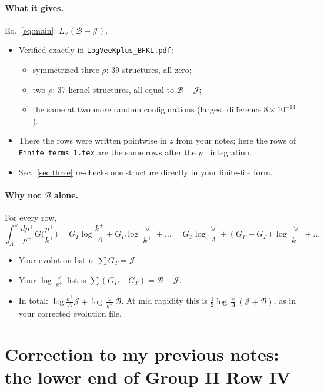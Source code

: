 \documentclass[10pt]{article}
\numberwithin{equation}{section}
\newcommand{\Lv}{L_{\vee}}
\newcommand{\JJ}{\mathcal J}
\newcommand{\BB}{\mathcal B}
\begin{document}
\paragraph{What it gives.} Eq.~\eqref{eq:main}: $\Lv(\BB-\JJ)$.
\begin{itemize}
\item Verified exactly in \texttt{LogVeeKplus\_BFKL.pdf}:
\begin{itemize}
\item symmetrized three-$\rho$: 39 structures, all zero;
\item two-$\rho$: 37 kernel structures, all equal to $\BB-\JJ$;
\item the same at two more random configurations (largest difference $8\times10^{-14}$).
\end{itemize}
\item There the rows were written pointwise in $z$ from your notes; here the rows of \texttt{Finite\_terms\_1.tex} are the same rows after the $p^+$ integration.
\item Sec.~\ref{sec:three} re-checks one structure directly in your finite-file form.
\end{itemize}

\paragraph{Why not $\BB$ alone.} For every row,
\begin{equation}
\int_\Lambda^\vee\frac{dp^+}{p^+}G\Big(\frac{p^+}{k^+}\Big)=G_T\log\frac{k^+}{\Lambda}+G_P\log\frac{\vee}{k^+}+\dots=G_T\log\frac{\vee}{\Lambda}+(G_P-G_T)\log\frac{\vee}{k^+}+\dots
\end{equation}
\begin{itemize}
\item Your evolution list is $\sum G_T=\JJ$.
\item Your $\log\frac{\vee}{k^+}$ list is $\sum(G_P-G_T)=\BB-\JJ$.
\item In total: $\log\frac{k^+}{\Lambda}\JJ+\log\frac{\vee}{k^+}\BB$. At mid rapidity this is $\frac12\log\frac\vee\Lambda(\JJ+\BB)$, as in your corrected evolution file.
\end{itemize}

\section{Correction to my previous notes: the lower end of Group II Row IV}\label{sec:fix}
\end{document}
